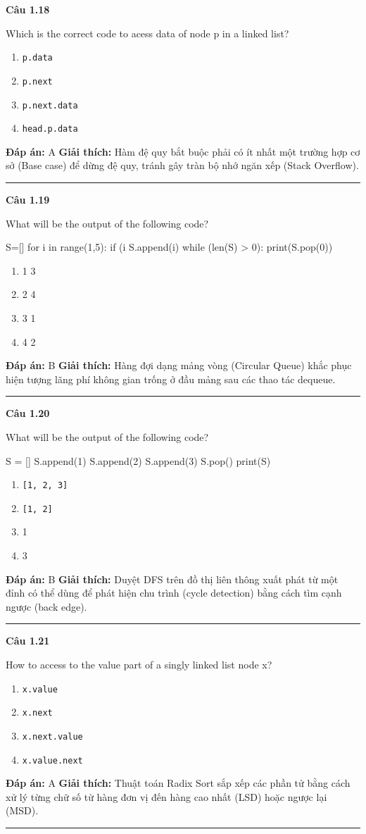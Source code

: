 \documentclass[11pt,a4paper]{article}
\newenvironment{question}[1]{%
  \par\vspace{1em}\noindent\textbf{\large Câu #1}\par\vspace{0.4em}
}{%
  \par\vspace{1em}\hrule\vspace{0.6em}
}
\newenvironment{choices}{%
  \begin{enumerate}[label=\textbf{\Alph*.},leftmargin=2.2em,itemsep=2pt,topsep=3pt]
}{%
  \end{enumerate}
}
\newcommand{\choice}{\item}
\newenvironment{codebox}{%
  \begin{tcolorbox}[colback=gray!8!white,colframe=gray!50!black,arc=1.5mm,boxrule=0.6pt,left=3mm,right=3mm,top=2.5mm,bottom=2.5mm]
  \ttfamily\small
}{%
  \end{tcolorbox}
}
\begin{document}
\begin{question}{1.18}
Which is the correct code to acess data of node p in a linked list?
\begin{choices}
\choice \texttt{p.data}
\choice \texttt{p.next}
\choice \texttt{p.next.data}
\choice \texttt{head.p.data}
\end{choices}
\textbf{Đáp án:} A
\textbf{Giải thích:} Hàm đệ quy bắt buộc phải có ít nhất một trường hợp cơ sở (Base case) để dừng đệ quy, tránh gây tràn bộ nhớ ngăn xếp (Stack Overflow).
\end{question}

\begin{question}{1.19}
What will be the output of the following code?
\begin{codebox}
S=[]
for i in range(1,5):
    if (i%
        S.append(i)
while (len(S) > 0):
    print(S.pop(0))
\end{codebox}
\begin{choices}
\choice 1 3
\choice 2 4
\choice 3 1
\choice 4 2
\end{choices}
\textbf{Đáp án:} B
\textbf{Giải thích:} Hàng đợi dạng mảng vòng (Circular Queue) khắc phục hiện tượng lãng phí không gian trống ở đầu mảng sau các thao tác dequeue.
\end{question}

\begin{question}{1.20}
What will be the output of the following code?
\begin{codebox}
S = []
S.append(1)
S.append(2)
S.append(3)
S.pop()
print(S)
\end{codebox}
\begin{choices}
\choice \texttt{[1, 2, 3]}
\choice \texttt{[1, 2]}
\choice 1
\choice 3
\end{choices}
\textbf{Đáp án:} B
\textbf{Giải thích:} Duyệt DFS trên đồ thị liên thông xuất phát từ một đỉnh có thể dùng để phát hiện chu trình (cycle detection) bằng cách tìm cạnh ngược (back edge).
\end{question}

\begin{question}{1.21}
How to access to the value part of a singly linked list node x?
\begin{choices}
\choice \texttt{x.value}
\choice \texttt{x.next}
\choice \texttt{x.next.value}
\choice \texttt{x.value.next}
\end{choices}
\textbf{Đáp án:} A
\textbf{Giải thích:} Thuật toán Radix Sort sắp xếp các phần tử bằng cách xử lý từng chữ số từ hàng đơn vị đến hàng cao nhất (LSD) hoặc ngược lại (MSD).
\end{question}
\end{document}
